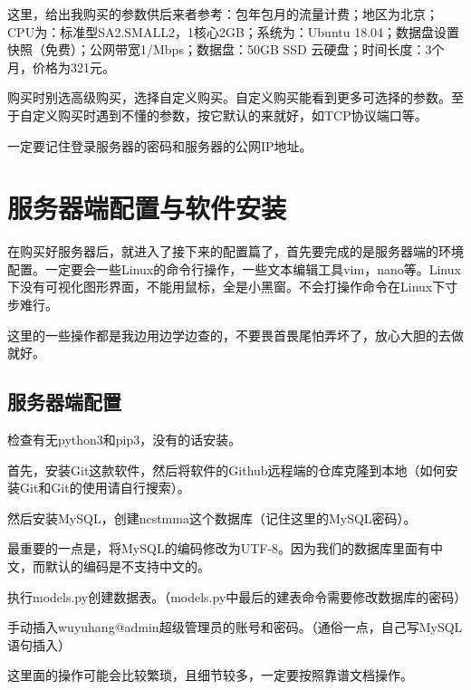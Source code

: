 \documentclass[lang=cn,hazy,normal,blue,12pt]{elegantnote}
\begin{document}
这里，给出我购买的参数供后来者参考：包年包月的流量计费；地区为北京；CPU为：标准型SA2.SMALL2，1核心2GB；系统为：Ubuntu 18.04；数据盘设置快照（免费）；公网带宽1/Mbps；数据盘：50GB SSD 云硬盘；时间长度：3个月，价格为321元。

\begin{note}
购买时别选高级购买，选择自定义购买。自定义购买能看到更多可选择的参数。至于自定义购买时遇到不懂的参数，按它默认的来就好，如TCP协议端口等。
\end{note}

\begin{note}
一定要记住登录服务器的密码和服务器的公网IP地址。
\end{note}

\section{服务器端配置与软件安装}

在购买好服务器后，就进入了接下来的配置篇了，首先要完成的是服务器端的环境配置。一定要会一些Linux的命令行操作，一些文本编辑工具vim，nano等。Linux下没有可视化图形界面，不能用鼠标，全是小黑窗。不会打操作命令在Linux下寸步难行。

\begin{note}
这里的一些操作都是我边用边学边查的，不要畏首畏尾怕弄坏了，放心大胆的去做就好。
\end{note}

\subsection{服务器端配置}

检查有无python3和pip3，没有的话安装。

首先，安装Git这款软件，然后将软件的Github远程端的仓库克隆到本地（如何安装Git和Git的使用请自行搜索）。

然后安装MySQL，创建ncstmma这个数据库（记住这里的MySQL密码）。

最重要的一点是，将MySQL的编码修改为UTF-8。因为我们的数据库里面有中文，而默认的编码是不支持中文的。

执行models.py创建数据表。（models.py中最后的建表命令需要修改数据库的密码）

手动插入wuyuhang@admin超级管理员的账号和密码。（通俗一点，自己写MySQL语句插入）

\begin{note}
这里面的操作可能会比较繁琐，且细节较多，一定要按照靠谱文档操作。
\end{note}
\end{document}
